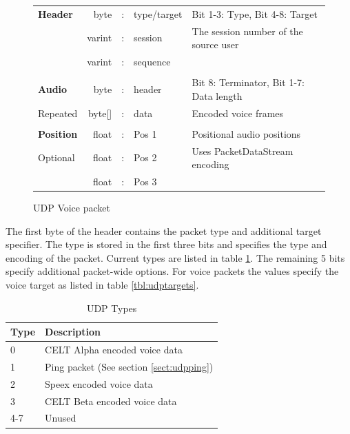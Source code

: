 \documentclass[11pt]{article} %
\begin{document}
\begin{figure}[H]\begin{center}\begin{tabular}{l|rcl|p{}}

\cline{2-4}
\textbf{Header} & byte &:& type/target & Bit 1-3: Type, Bit 4-8: Target \\
				\cline{2-4}
				& varint &:& session & The session number of the source user \\
				\cline{2-4}
				& varint &:& sequence & \\
				\cline{2-4}
\multicolumn{5}{c}{} \\
				\cline{2-4}
\textbf{Audio}	& byte &:& header & Bit 8: Terminator, Bit 1-7: Data length \\
				\cline{2-4}
Repeated		& byte[] &:& data & Encoded voice frames\\
				\cline{2-4}
\multicolumn{5}{c}{} \\
				\cline{2-4}

\textbf{Position} & float &:& Pos 1 & Positional audio positions \\
				\cline{2-4}
Optional		& float &:& Pos 2 & Uses PacketDataStream encoding \\
				\cline{2-4}
				& float &:& Pos 3 & \\
				\cline{2-4}

\end{tabular}
\caption{UDP Voice packet}\label{fig:udpvoice}
\end{center}\end{figure}

The first byte of the header contains the packet type and additional target specifier. The type is stored in the first three bits and specifies the type and encoding of the packet. Current types are listed in table \ref{tbl:udptypes}. The remaining 5 bits specify additional packet-wide options. For voice packets the values specify the voice target as listed in table \ref{tbl:udptargets}.

\begin{table}[H]\begin{center}
	\caption{UDP Types}\label{tbl:udptypes}

	\begin{tabular}{ll}
		Type & Description \\
		\hline
		0	& CELT Alpha encoded voice data \\
		1	& Ping packet (See section \ref{sect:udpping}) \\
		2	& Speex encoded voice data \\
		3	& CELT Beta encoded voice data \\
		4-7 & Unused
	\end{tabular}
\end{center}\end{table}
\end{document}

